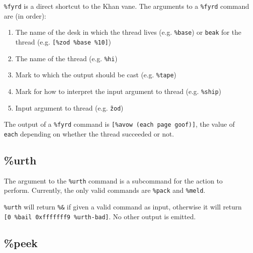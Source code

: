 \documentclass[twoside]{article}
\begin{document}
\texttt{\%fyrd} is a direct shortcut to the Khan vane. The arguments to a \texttt{\%fyrd} command are (in order):
\begin{enumerate}
  \item The name of the desk in which the thread lives (e.g. \texttt{\%base}) or \texttt{beak} for the thread (e.g. \texttt{[\%zod \%base \%10]})
  \item The name of the thread (e.g. \texttt{\%hi})
  \item Mark to which the output should be cast (e.g. \texttt{\%tape})
  \item Mark for how to interpret the input argument to thread (e.g. \texttt{\%ship})
  \item Input argument to thread (e.g. \texttt{\~zod})
\end{enumerate}

The output of a \texttt{\%fyrd} command is \texttt{[\%avow (each page goof)]}, the value of \texttt{each} depending on whether the thread succeeded or not.

\subsection{\%urth}

The argument to the \texttt{\%urth} command is a subcommand for the action to perform. Currently, the only valid commands are \texttt{\%pack} and \texttt{\%meld}.

\texttt{\%urth} will return \texttt{\%\&} if given a valid command as input, otherwise it will return \texttt{[0 \%bail 0xfffffff9 \%urth-bad]}. No other output is emitted.

\subsection{\%peek}
\end{document}
